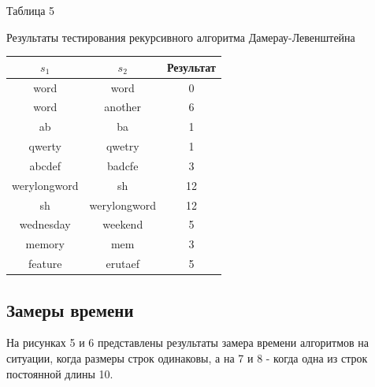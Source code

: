 \documentclass[a4paper,12pt]{article}
\begin{document}
\hfill

\begin{flushright}
    Таблица 5
\end{flushright}

\begin{center}
    Результаты тестирования рекурсивного алгоритма Дамерау-Левенштейна

    \begin{tabular}{|c|c|c|}
        \hline
        $s_1$ & $s_2$ & Результат \\
        \hline
        word & word & 0 \\
        \hline
        word & another & 6 \\
        \hline
        ab & ba & 1 \\
        \hline
        qwerty & qwetry & 1 \\
        \hline
        abcdef & badcfe & 3 \\
        \hline
        werylongword & sh & 12 \\
        \hline
        sh & werylongword & 12 \\
        \hline
        wednesday & weekend & 5 \\
        \hline
        memory & mem & 3 \\
        \hline
        feature & erutaef & 5 \\
        \hline
    \end{tabular}
\end{center}

\subsection{Замеры времени}

На рисунках 5 и 6 представлены результаты замера времени алгоритмов на ситуации,
когда размеры строк одинаковы, а на 7 и 8 - когда одна из строк постоянной длины 10.
\end{document}

